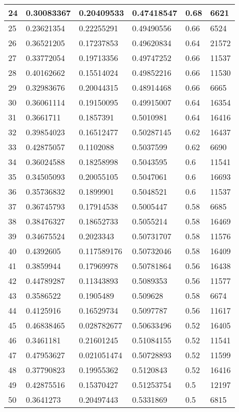\begin{longtable}{|l|l|l|l|l|l|}
24 & 0.30083367 & 0.20409533 & 0.47418547 & 0.68 & 6621 \\ \hline 
25 & 0.23621354 & 0.22255291 & 0.49490556 & 0.66 & 6524 \\ \hline 
26 & 0.36521205 & 0.17237853 & 0.49620834 & 0.64 & 21572 \\ \hline 
27 & 0.33772054 & 0.19713356 & 0.49747252 & 0.66 & 11537 \\ \hline 
28 & 0.40162662 & 0.15514024 & 0.49852216 & 0.66 & 11530 \\ \hline 
29 & 0.32983676 & 0.20044315 & 0.48914468 & 0.66 & 6665 \\ \hline 
30 & 0.36061114 & 0.19150095 & 0.49915007 & 0.64 & 16354 \\ \hline 
31 & 0.3661711 & 0.1857391 & 0.5010981 & 0.64 & 16416 \\ \hline 
32 & 0.39854023 & 0.16512477 & 0.50287145 & 0.62 & 16437 \\ \hline 
33 & 0.42875057 & 0.1102088 & 0.5037599 & 0.62 & 6690 \\ \hline 
34 & 0.36024588 & 0.18258998 & 0.5043595 & 0.6 & 11541 \\ \hline 
35 & 0.34505093 & 0.20055105 & 0.5047061 & 0.6 & 16693 \\ \hline 
36 & 0.35736832 & 0.1899901 & 0.5048521 & 0.6 & 11537 \\ \hline 
37 & 0.36745793 & 0.17914538 & 0.5005447 & 0.58 & 6685 \\ \hline 
38 & 0.38476327 & 0.18652733 & 0.5055214 & 0.58 & 16469 \\ \hline 
39 & 0.34675524 & 0.2023343 & 0.50731707 & 0.58 & 11576 \\ \hline 
40 & 0.4392605 & 0.117589176 & 0.50732046 & 0.58 & 16409 \\ \hline 
41 & 0.3859944 & 0.17969978 & 0.50781864 & 0.56 & 16438 \\ \hline 
42 & 0.44789287 & 0.11343893 & 0.5089353 & 0.56 & 11577 \\ \hline 
43 & 0.3586522 & 0.1905489 & 0.509628 & 0.58 & 6674 \\ \hline 
44 & 0.4125916 & 0.16529734 & 0.5097787 & 0.56 & 11617 \\ \hline 
45 & 0.46838465 & 0.028782677 & 0.50633496 & 0.52 & 16405 \\ \hline 
46 & 0.3461181 & 0.21601245 & 0.51084155 & 0.52 & 11541 \\ \hline 
47 & 0.47953627 & 0.021051474 & 0.50728893 & 0.52 & 11599 \\ \hline 
48 & 0.37790823 & 0.19955362 & 0.5120843 & 0.52 & 16416 \\ \hline 
49 & 0.42875516 & 0.15370427 & 0.51253754 & 0.5 & 12197 \\ \hline 
50 & 0.3641273 & 0.20497443 & 0.5331869 & 0.5 & 6815 \\ \hline 
\end{longtable}